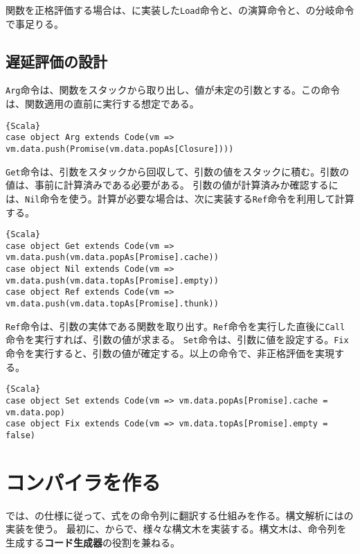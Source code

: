 \documentclass[10pt,a4paper]{book}
\begin{document}
関数を正格評価する場合は、に実装した\texttt{Load}命令と、の演算命令と、の分岐命令で事足りる。

\section{遅延評価の設計\label{sect:lazy}}

\texttt{Arg}命令は、関数をスタックから取り出し、値が未定の引数とする。この命令は、関数適用の直前に実行する想定である。

\begin{Verbatim}{Scala}
case object Arg extends Code(vm => vm.data.push(Promise(vm.data.popAs[Closure])))
\end{Verbatim}

\texttt{Get}命令は、引数をスタックから回収して、引数の値をスタックに積む。引数の値は、事前に計算済みである必要がある。
引数の値が計算済みか確認するには、\texttt{Nil}命令を使う。計算が必要な場合は、次に実装する\texttt{Ref}命令を利用して計算する。

\begin{Verbatim}{Scala}
case object Get extends Code(vm => vm.data.push(vm.data.popAs[Promise].cache))
case object Nil extends Code(vm => vm.data.push(vm.data.topAs[Promise].empty))
case object Ref extends Code(vm => vm.data.push(vm.data.topAs[Promise].thunk))
\end{Verbatim}

\texttt{Ref}命令は、引数の実体である関数を取り出す。\texttt{Ref}命令を実行した直後に\texttt{Call}命令を実行すれば、引数の値が求まる。
\texttt{Set}命令は、引数に値を設定する。\texttt{Fix}命令を実行すると、引数の値が確定する。以上の命令で、非正格評価を実現する。

\begin{Verbatim}{Scala}
case object Set extends Code(vm => vm.data.popAs[Promise].cache = vm.data.pop)
case object Fix extends Code(vm => vm.data.topAs[Promise].empty = false)
\end{Verbatim}

\chapter{コンパイラを作る\label{chap:favac}}

では、の仕様に従って、式をの命令列に翻訳する仕組みを作る。構文解析にはの実装を使う。
最初に、からで、様々な構文木を実装する。構文木は、命令列を生成する\textbf{コード生成器}の役割を兼ねる。
\end{document}
